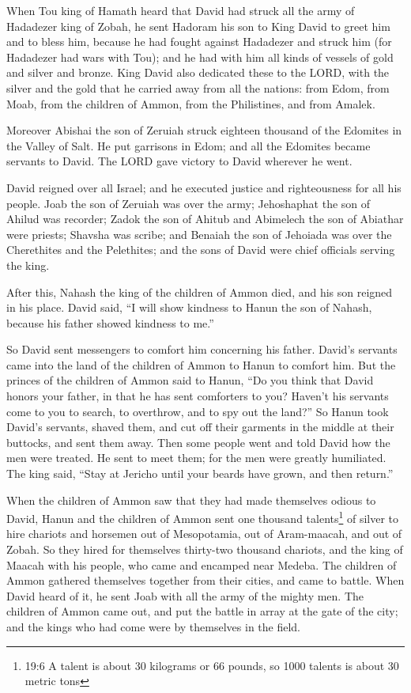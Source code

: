\myverse{}When Tou king of Hamath heard that David had struck all the army
of Hadadezer king of Zobah,
\myverse{}he sent Hadoram his son to King David to greet him and to bless him, because
he had fought against Hadadezer and struck him (for Hadadezer had wars with Tou); and he had with him
all kinds of vessels of gold and silver and bronze.
\myverse{}King David also dedicated these to the LORD, with the silver and the gold
that he carried away from all the nations: from Edom, from Moab, from the children of Ammon, from the
Philistines, and from Amalek.

\myverse{}Moreover Abishai the son of Zeruiah struck eighteen thousand
of the Edomites in the Valley of Salt.
\myverse{}He put garrisons in Edom; and all the Edomites became servants to David.
The LORD gave victory to David wherever he went.

\myverse{}David reigned over all Israel; and he executed justice and righteousness
for all his people.
\myverse{}Joab the son of Zeruiah was over the army; Jehoshaphat the son of Ahilud
was recorder;
\myverse{}Zadok the son of Ahitub and Abimelech the son of Abiathar were priests; Shavsha
was scribe;
\myverse{}and Benaiah the son of Jehoiada was over the Cherethites and the Pelethites;
and the sons of David were chief officials serving the king.


\mychapter{} \myverse*{}After this, Nahash the king of the children of Ammon died, and
his son reigned in his place.
\myverse{}David said, “I will show kindness to Hanun the son of Nahash, because his father
showed kindness to me.”

So David sent messengers to comfort him concerning his father. David’s servants came into
the land of the children of Ammon to Hanun to comfort him.
\myverse{}But the princes of the children of Ammon said to Hanun, “Do you think that
David honors your father, in that he has sent comforters to you? Haven’t his servants come to you to search,
to overthrow, and to spy out the land?”
\myverse{}So Hanun took David’s servants, shaved them, and cut off their garments in
the middle at their buttocks, and sent them away.
\myverse{}Then some people went and told David how the men were treated. He sent to meet
them; for the men were greatly humiliated. The king said, “Stay at Jericho until your beards have grown,
and then return.”

\myverse{}When the children of Ammon saw that they had made themselves odious
to David, Hanun and the children of Ammon sent one thousand talents\footnote{19:6 A talent is about 30 kilograms or 66 pounds, so 1000 talents is about 30 metric tons}
of silver to hire chariots and horsemen out of Mesopotamia, out of Aram-maacah, and out of Zobah.
\myverse{}So they hired for themselves thirty-two thousand chariots, and the king of
Maacah with his people, who came and encamped near Medeba. The children of Ammon gathered themselves together
from their cities, and came to battle.
\myverse{}When David heard of it, he sent Joab with all the army of the mighty men.
\myverse{}The children of Ammon came out, and put the battle in array at the gate of
the city; and the kings who had come were by themselves in the field.

